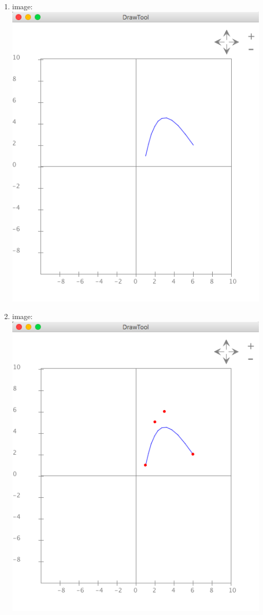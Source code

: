 \documentclass{article}
\begin{document}
\begin{enumerate}
\item image:\\
\includegraphics[scale=0.3]{exercise26}

\item image:\\
\includegraphics[scale=0.3]{exercise27}


\end{enumerate}
\end{document}
